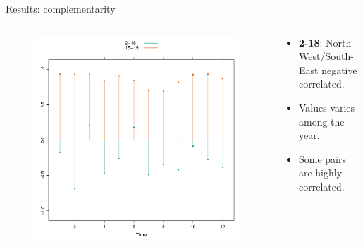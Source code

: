 \documentclass{beamer}%
\begin{document}

\begin{frame}[fragile]{Results: complementarity}
  \begin{columns}
    \begin{column}{0.6\textwidth}
      \begin{figure}
        \includegraphics[scale=0.37]{figure9.pdf}
      \end{figure}
\end{column}
    \begin{column}{0.5\textwidth}
      \begin{itemize}
      \item \textbf{2-18}: North-West/South-East negative correlated.
      \item Values varies among the year.
      \item Some pairs are highly correlated.
      \end{itemize}  
    \end{column}
  \end{columns}
\end{frame}
\end{document}
